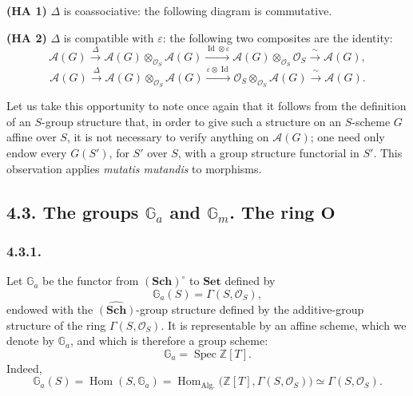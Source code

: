 \medskip
\noindent\textbf{(HA 1)}
\(\Delta\) is coassociative: the following diagram is commutative.

\begin{figure}[H]
  \centering
  
  \label{fig:sga3-exp1-p022-hopf-coassociativity}
\end{figure}

\noindent\textbf{(HA 2)}
\(\Delta\) is compatible with \(\varepsilon\): the following two composites
are the identity:
\[
  \mathscr A(G)
    \xrightarrow{\Delta}
  \mathscr A(G)\otimes_{\mathcal O_S}\mathscr A(G)
    \xrightarrow{\operatorname{Id}\otimes\varepsilon}
  \mathscr A(G)\otimes_{\mathcal O_S}\mathcal O_S
    \xrightarrow{\ \sim\ }
  \mathscr A(G),
\]
\[
  \mathscr A(G)
    \xrightarrow{\Delta}
  \mathscr A(G)\otimes_{\mathcal O_S}\mathscr A(G)
    \xrightarrow{\varepsilon\otimes\operatorname{Id}}
  \mathcal O_S\otimes_{\mathcal O_S}\mathscr A(G)
    \xrightarrow{\ \sim\ }
  \mathscr A(G).
\]

Let us take this opportunity to note once again that it follows from the
definition of an \(S\)-group structure that, in order to give such a
structure on an \(S\)-scheme \(G\) affine over \(S\), it is not necessary
to verify anything on \(\mathscr A(G)\); one need only endow every
\(G(S')\), for \(S'\) over \(S\), with a group structure functorial in
\(S'\). This observation applies \emph{mutatis mutandis} to morphisms.

\subsection*{4.3. The groups \(\mathbb G_a\) and \(\mathbb G_m\). The ring
\(\mathbf O\)}

\subsubsection*{4.3.1.}

Let \(\mathbb G_a\) be the functor from \((\mathbf{Sch})^{\circ}\) to
\(\mathbf{Set}\) defined by
\[
  \mathbb G_a(S)=\Gamma(S,\mathcal O_S),
\]
endowed with the \(\widehat{(\mathbf{Sch})}\)-group structure defined by
the additive-group structure of the ring \(\Gamma(S,\mathcal O_S)\). It
is representable by an affine scheme, which we denote by \(\mathbb G_a\),
and which is therefore a group scheme:
\[
  \mathbb G_a=\operatorname{Spec}\mathbb Z[T].
\]
Indeed,
\[
  \mathbb G_a(S)
    =\operatorname{Hom}(S,\mathbb G_a)
    =\operatorname{Hom}_{\mathrm{Alg.}}
       \bigl(\mathbb Z[T],\Gamma(S,\mathcal O_S)\bigr)
    \simeq\Gamma(S,\mathcal O_S).
\]

